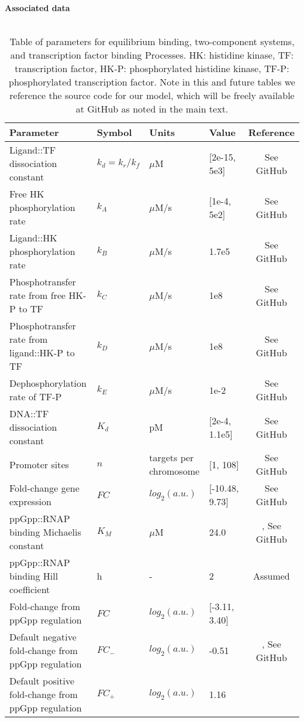 \documentclass[12pt]{article}
\begin{document}
\begin{table}[H]
\hspace{16pt} \textbf{Associated data} \\\\
 \label{transcription_regulation_table}
 \begin{tabular}{p{2in} p{0.8in} p{0.9in} p{1in} c}
 \hline
 Parameter & Symbol & Units & Value & Reference \\
 \hline
Ligand::TF dissociation constant & $k_d = k_r/k_f$ & $\mu$M & [2e-15, 5e3] & See GitHub   \\
Free HK phosphorylation rate & $k_A$ & $\mu$M/s & [1e-4, 5e2] & See GitHub  \\
Ligand::HK phosphorylation rate & $k_B$ & $\mu$M/s & 1.7e5 & See GitHub  \\
Phosphotransfer rate from free HK-P to TF & $k_C$ & $\mu$M/s & 1e8 & See GitHub  \\
Phosphotransfer rate from ligand::HK-P to TF & $k_D$ & $\mu$M/s & 1e8 & See GitHub  \\
Dephosphorylation rate of TF-P & $k_E$ & $\mu$M/s & 1e-2 & See GitHub  \\
DNA::TF dissociation constant & $K_d$ & pM & [2e-4, 1.1e5] & See GitHub  \\
Promoter sites & $n$ & targets per chromosome & [1, 108] & See GitHub  \\
Fold-change gene expression & $FC$ & $log_{2}(a.u.)$ & [-10.48, 9.73] & See GitHub  \\
ppGpp::RNAP binding Michaelis constant & $K_M$ & $\mu$M & 24.0 & \cite{Bremer:1996uj}, See GitHub \\
ppGpp::RNAP binding Hill coefficient & h & - & 2 & Assumed \\
Fold-change from ppGpp regulation & $FC$ & $log_{2}(a.u.)$ & [-3.11, 3.40] & \cite{sanchez2019genome} \\
Default negative fold-change from ppGpp regulation & $FC_-$ & $log_{2}(a.u.)$ & -0.51 & \cite{Bremer:1996uj}, See GitHub \\
Default positive fold-change from ppGpp regulation & $FC_+$ & $log_{2}(a.u.)$ & 1.16 & \cite{sanchez2019genome} \\

 \hline
\end{tabular}
\caption[Table of parameters for transcription regulation]{Table of parameters for equilibrium binding, two-component systems, and transcription factor binding Processes. HK: histidine kinase, TF: transcription factor, HK-P: phosphorylated histidine kinase, TF-P: phosphorylated transcription factor. Note in this and future tables we reference the source code for our model, which will be freely available at GitHub as noted in the main text.}
\end{table}
\end{document}
